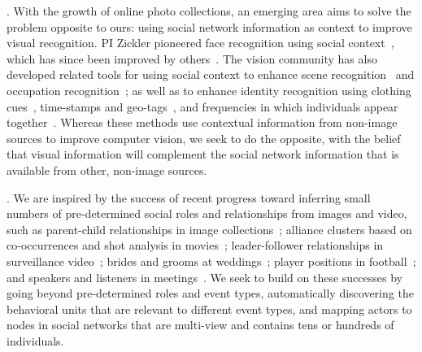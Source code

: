 . With the growth of online photo collections, an emerging area aims to solve the problem opposite to ours: using social network information as context to improve visual recognition. PI Zickler pioneered face recognition using social context~\cite{Stone2008,Stone2010}, which has since been improved by others~\cite{Dikmen:classify,Poppe2012,LeeBMVC2011,hanalbum2013album}. The vision community has also developed related tools for using social context to enhance scene recognition~\cite{McAuley:socialclassify} and occupation recognition~\cite{occupation2013}; as well as to enhance identity recognition using clothing cues~\cite{anguelov2007cir, zhang2003aah,  song2006cah, sivic2006fpr}, time-stamps and geo-tags~\cite{naaman2005lcr, zhao2006apa}, and frequencies in which individuals appear together~\cite{anguelov2007cir}. Whereas these methods use contextual information from non-image sources to improve computer vision, we seek to do the opposite, with the belief that visual information will complement the social network information that is available from other, non-image sources. 


. We are inspired by the success of recent progress toward inferring small numbers of pre-determined social roles and relationships from images and video, such as parent-child relationships in image collections~\cite{Gallagher,Wang2010,Murillo2012}; alliance clusters based on co-occurrences and shot analysis in movies~\cite{Ding2010,Ding2011}; leader-follower relationships in surveillance video~\cite{Yu2009,Zhang2011}; brides and grooms at weddings~\cite{FeiFeiRole2013}; player positions in football~\cite{LanSM12}; and speakers and listeners in meetings~\cite{meetingrolerecognition}. We seek to build on these successes by going beyond pre-determined roles and event types, automatically discovering the behavioral units that are relevant to different event types, and mapping actors to nodes in social networks that are multi-view and contains tens or hundreds of individuals.

